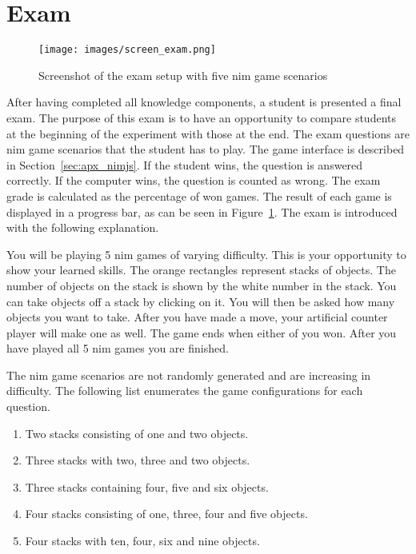\section{Exam}
\begin{figure}[ht]
    \centering
    \texttt{[image: images/screen\_exam.png]}
    \caption{Screenshot of the exam setup with five nim game scenarios}
    \label{fig:screen_exam}
\end{figure}
After having completed all knowledge components, a student is presented a final
exam. The purpose of this exam is to have an opportunity to compare students at
the beginning of the experiment with those at the end. The exam questions are
nim game scenarios that the student has to play. The game interface is
described in Section~\ref{sec:apx_nimjs}. If the student wins, the
question is answered correctly. If the computer wins, the question is counted
as wrong. The exam grade is calculated as the percentage of won games. The result
of each game is displayed in a progress bar, as can be seen in
Figure~\ref{fig:screen_exam}. The exam is introduced with the following explanation.
\begin{framed}\noindent
	You will be playing 5 nim games of varying difficulty. This is your
	opportunity to show your learned skills. The orange rectangles represent
	stacks of objects. The number of objects on the stack is shown by the white
	number in the stack. You can take objects off a stack by clicking on it.
	You will then be asked how many objects you want to take. After you have
	made a move, your artificial counter player will make one as well. The game
	ends when either of you won.
	After you have played all 5 nim games you are finished.
\end{framed}
\noindent The nim game scenarios are not randomly generated and are increasing in
difficulty. The following list enumerates the game configurations for each
question.
\begin{enumerate}
	\item Two stacks consisting of one and two objects.
	\item Three stacks with two, three and two objects.
	\item Three stacks containing four, five and six objects.
	\item Four stacks consisting of one, three, four and five objects.
	\item Four stacks with ten, four, six and nine objects.
\end{enumerate}
